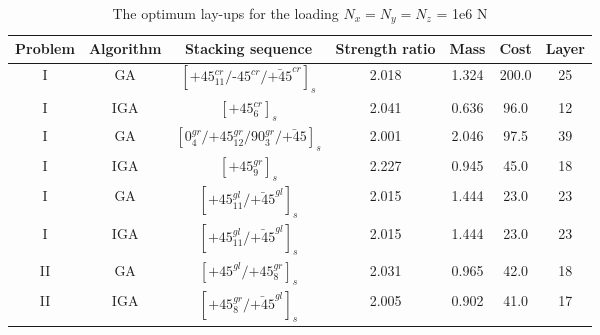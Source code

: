 \documentclass[Afour,sagev,times]{sagej}
\begin{document}
\begin{table}[!htb]
	\caption{The optimum lay-ups for the loading $N_x=N_y=N_z$ = 1e6 N} 
	\centering
	\begin{adjustbox}{width=1\textwidth}
	\begin{tabular}{ccccccc}
	\toprule
	       Problem  &   Algorithm      & Stacking sequence                                    & Strength ratio  & Mass  &  Cost   & Layer    \\ 
	\midrule																								  
	   	  I  & GA   &  $[\text{+}45_{11}^{cr}/\text{-}45^{cr}/\bar{\text{+}45}^{cr}]_s$                            & 2.018           & 1.324 &  200.0  & 25  \\
	      I  & IGA  &  $[\text{+}45_{6}^{cr}]_s$                            & 2.041           & 0.636 &  96.0  & 12  \\
          I  & GA   &  $[0_4^{gr}/\text{+}45_{12}^{gr}/90_3^{gr}/\bar{\text{+}45}]_s$                            & 2.001           & 2.046 &  97.5  & 39  \\
		  I  & IGA  &  $[\text{+}45_{9}^{gr}]_s$                            & 2.227           & 0.945 &  45.0  & 18  \\
		  I  & GA   &  $[\text{+}45_{11}^{gl}/\bar{\text{+}45}^{gl}]_s$                            & 2.015           & 1.444 &  23.0  & 23  \\
		  I  & IGA  &   $[\text{+}45_{11}^{gl}/\bar{\text{+}45}^{gl}]_s$                           & 2.015           & 1.444 &  23.0  & 23  \\
		  II &  GA  &  $[\text{+}45^{gl}/\text{+}45_{8}^{gr}]_s$          & 2.031           & 0.965 &  42.0  & 18 \\
		  II & IGA  &  $[\text{+}45_8^{gr}/\bar{\text{+}45}^{gl}]_s$          & 2.005           & 0.902 &  41.0  & 17 \\
	\bottomrule
\end{tabular}
\label{tab:NxNyNz}
	\end{adjustbox}
\end{table}
\end{document}
